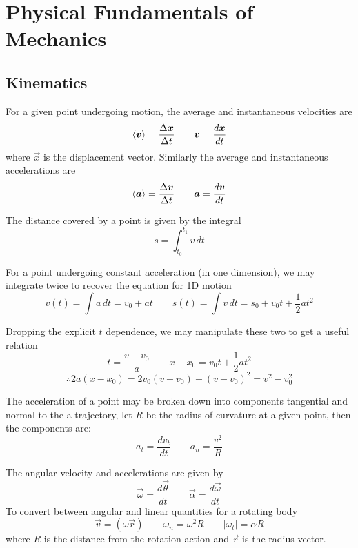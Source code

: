 \section{Physical Fundamentals of Mechanics}
\subsection{Kinematics}
For a given point undergoing motion, the average and instantaneous velocities are
\[ \vbrack{\vec{v}} = \frac{\Delta \vec x}{\Delta t} \qquad \vec v = \frac{d\vec x}{dt} \]
where $\vec x$ is the displacement vector. Similarly the average and instantaneous accelerations are
\[ \vbrack{\vec a} = \frac{\Delta \vec v}{\Delta t} \qquad \vec a = \frac{d\vec v}{dt} \]
 
The distance covered by a point is given by the integral
\[ s = \int_{t_0}^{t_1} v \, dt \] 

For a point undergoing constant acceleration (in one dimension), we may integrate twice to recover the equation for 1D motion
\[ v(t) = \int a\, dt = v_0 + at \qquad s(t) = \int v\, dt = s_0 + v_0t + \frac{1}{2} at^2 \]

Dropping the explicit $t$ dependence, we may manipulate these two to get a useful relation
\[ t = \frac{v - v_0}{a} \qquad x - x_0 = v_0 t + \frac{1}{2}at^2 \]
\[ \therefore 2a(x - x_0) = 2v_0(v - v_0) + (v - v_0)^2 = v^2 - v_0^2 \]
 
The acceleration of a point may be broken down into components tangential and normal to the a trajectory, let $R$ be the radius of curvature at a given point, then the components are:
 \[ a_t = \frac{d v_t}{dt} \qquad a_n = \frac{v^2}{R} \]
 
The angular velocity and accelerations are given by
\[ \vec{\omega} = \frac{d\vec\theta}{dt} \qquad \vec\alpha = \frac{d\vec\omega}{dt} \]
To convert between angular and linear quantities for a rotating body
\[ \vec{v} = (\omega \vec r) \qquad \omega_n = \omega^2 R \qquad |\omega_t| = \alpha R \]
where $R$ is the distance from the rotation action and $\vec r$ is the radius vector.

